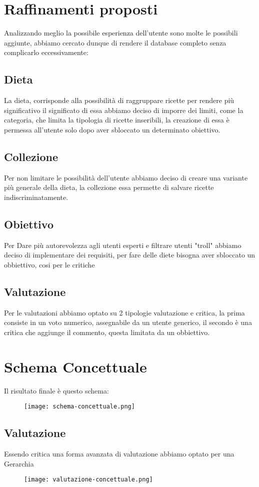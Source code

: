 ﻿\documentclass[a4paper,12pt]{report}
\begin{document}
\section{Raffinamenti proposti}
Analizzando meglio la possibile esperienza dell'utente
sono molte le possibili aggiunte, abbiamo cercato
dunque di rendere il database completo senza complicarlo eccessivamente:
\subsection{Dieta}
La dieta, corrisponde alla possibilità di raggruppare ricette
per rendere più significativo il significato di essa abbiamo deciso di 
imporre dei limiti, come la categoria, che limita la tipologia di ricette 
inseribili, la creazione di essa è permessa all'utente solo dopo aver sbloccato un determinato obiettivo.
\subsection{Collezione}
Per non limitare le possibilità dell'utente abbiamo deciso di creare 
una variante più generale della dieta, la collezione
essa permette di salvare ricette indiscriminatamente.
\subsection{Obiettivo}
Per Dare più autorevolezza agli utenti esperti e
filtrare utenti "troll" abbiamo deciso di implementare dei requisiti,
per fare delle diete bisogna aver sbloccato un obbiettivo, 
cosi per le critiche
\subsection{Valutazione}
Per le valutazioni abbiamo optato su 2 tipologie
valutazione e critica, la prima consiste in un voto
numerico, assegnabile da un utente generico, il secondo è una critica
che aggiunge il commento, questa limitata da un obbiettivo.\\
\section{Schema Concettuale}
Il risultato finale è questo schema:
\begin{figure}[H]
    \centering
    \texttt{[image: schema-concettuale.png]}
\end{figure}

\subsection{Valutazione}
Essendo critica una forma avanzata di valutazione
abbiamo optato per una Gerarchia
\begin{figure}[H]
    \centering
    \texttt{[image: valutazione-concettuale.png]}
\end{figure}
\end{document}
